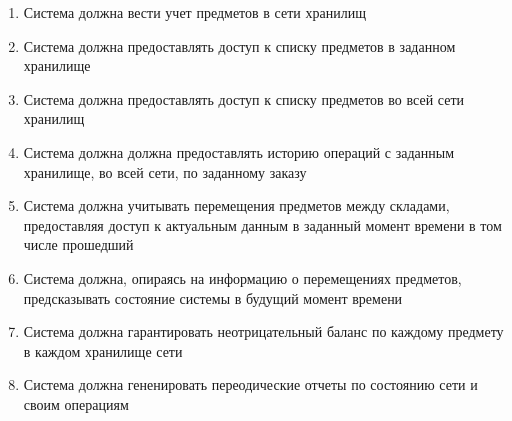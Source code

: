 \begin{enumerate}
  \item Система должна вести учет предметов 
        в сети хранилищ
        
  \item Система должна предоставлять доступ к
        списку предметов в заданном хранилище

  \item Система должна предоставлять доступ к
        списку предметов во всей сети хранилищ

  \item Система должна должна предоставлять
        историю операций с заданным хранилище,
        во всей сети, по заданному заказу

  \item Система должна учитывать перемещения
        предметов между складами, предоставляя
        доступ к актуальным данным в заданный
        момент времени в том числе прошедший

  \item Система должна, опираясь на информацию
        о перемещениях предметов, предсказывать
        состояние системы в будущий момент времени

  \item Система должна гарантировать неотрицательный
        баланс по каждому предмету в каждом хранилище
        сети

  \item Система должна гененировать переодические 
        отчеты по состоянию сети и своим операциям

\end{enumerate}